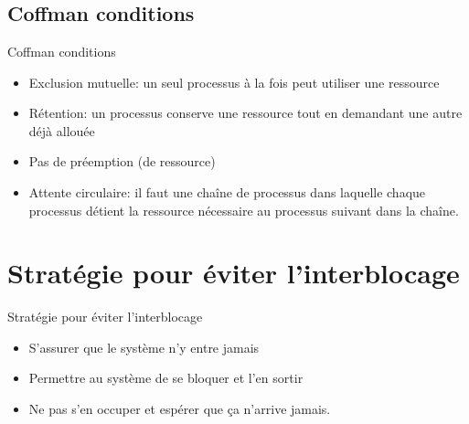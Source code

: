 \section{\sectitle}
\begin{frame}{\sectitle}
\def\subsectitle{Coffman conditions}
\subsection{\subsectitle}
\begin{block}{\subsectitle}
\begin{itemize}
    \item Exclusion mutuelle: un seul processus à la fois peut utiliser une
    ressource
    \item Rétention: un processus conserve une ressource tout en demandant une
    autre déjà allouée
    \item Pas de préemption (de ressource)
    \item Attente circulaire: il faut une chaîne de processus dans laquelle
    chaque processus détient la ressource nécessaire au processus suivant dans
    la chaîne.
\end{itemize}
\end{block}
\end{frame}

\def\sectitle{Stratégie pour éviter l'interblocage}
\section{\sectitle}
\begin{frame}{\sectitle}
\begin{block}{\subsectitle}
\begin{itemize}
    \item S'assurer que le système n'y entre jamais
    \item Permettre au système de se bloquer et l'en sortir
    \item Ne pas s'en occuper et espérer que ça n'arrive jamais.
\end{itemize}
\end{block}
\end{frame}

\def\sectitle{Prévention}
